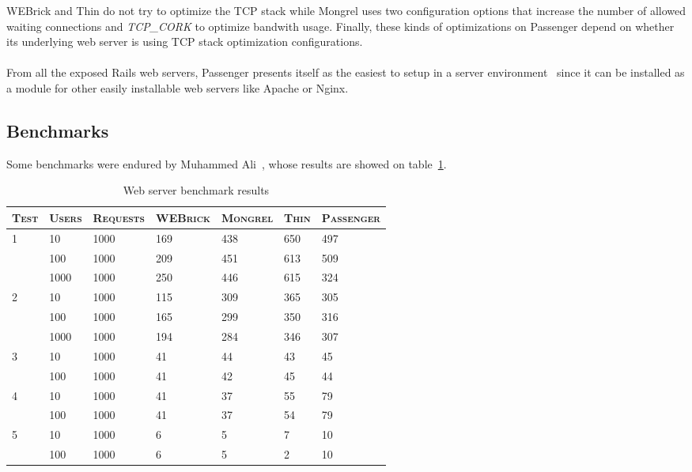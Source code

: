 WEBrick and Thin do not try to optimize the TCP stack while Mongrel uses two configuration options that increase the number of allowed waiting connections and \textit{TCP\_CORK} to optimize bandwith usage. Finally, these kinds of optimizations on Passenger depend on whether its underlying web server is using TCP stack optimization configurations.\\\\%
From all the exposed Rails web servers, Passenger presents itself as the easiest to setup in a server environment~\cite{ruby_webservers} since it can be installed as a module for other easily installable web servers like Apache or Nginx.

\subsection{Benchmarks}
Some benchmarks were endured by Muhammed Ali~\cite{ruby_webservers}, whose results are showed on table~\ref{tab:webserver_benchmarks}.
\begin{table}[h!t]
  \centering
  
  \begin{tabular}{p{1.3cm}|p{1.8cm}|p{2cm}|p{2cm}|p{2cm}|p{1.3cm}|p{2cm}}
    \textsc{Test}
  & \textsc{Users}
  & \textsc{Requests}
  & \textsc{WEBrick}
  & \textsc{Mongrel}
  & \textsc{Thin}
  & \textsc{Passenger} \\
  \hline

  \multirow{3}{*}{1}
  & 10 & 1000 & 169 & 438 & 650 & 497\\
  & 100 & 1000 & 209 & 451 & 613 & 509\\
  & 1000 & 1000 & 250 & 446 & 615 & 324\\
  \hline
    
  \multirow{3}{*}{2}
  & 10 & 1000 & 115 & 309 & 365 & 305\\
  & 100 & 1000 & 165 & 299 & 350 & 316\\
  & 1000 & 1000 & 194 & 284 & 346 & 307\\
  \hline
  
  \multirow{2}{*}{3}
  & 10 & 1000 & 41 & 44 & 43 & 45\\
  & 100 & 1000 & 41 & 42 & 45 & 44\\
  \hline

  \multirow{2}{*}{4}
  & 10 & 1000 & 41 & 37 & 55 & 79\\
  & 100 & 1000 & 41 & 37 & 54 & 79\\
  \hline
  
  \multirow{2}{*}{5}
  & 10 & 1000 & 6 & 5 & 7 & 10\\
  & 100 & 1000 & 6 & 5 & 2 & 10\\
  
  \end{tabular}
  \caption{Web server benchmark results}
  \label{tab:webserver_benchmarks}
\end{table}

